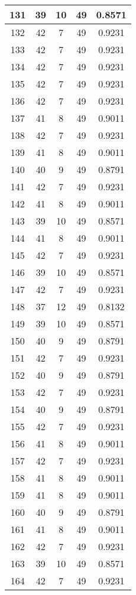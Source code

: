\documentclass[letterpaper, 12pt]{article}
\begin{document}
\begin{longtable}{|c|c|c|c|c|}
\hline
131 & 39 & 10 & 49 & 0.8571 \\
\hline
132 & 42 & 7 & 49 & 0.9231 \\
\hline
133 & 42 & 7 & 49 & 0.9231 \\
\hline
134 & 42 & 7 & 49 & 0.9231 \\
\hline
135 & 42 & 7 & 49 & 0.9231 \\
\hline
136 & 42 & 7 & 49 & 0.9231 \\
\hline
137 & 41 & 8 & 49 & 0.9011 \\
\hline
138 & 42 & 7 & 49 & 0.9231 \\
\hline
139 & 41 & 8 & 49 & 0.9011 \\
\hline
140 & 40 & 9 & 49 & 0.8791 \\
\hline
141 & 42 & 7 & 49 & 0.9231 \\
\hline
142 & 41 & 8 & 49 & 0.9011 \\
\hline
143 & 39 & 10 & 49 & 0.8571 \\
\hline
144 & 41 & 8 & 49 & 0.9011 \\
\hline
145 & 42 & 7 & 49 & 0.9231 \\
\hline
146 & 39 & 10 & 49 & 0.8571 \\
\hline
147 & 42 & 7 & 49 & 0.9231 \\
\hline
148 & 37 & 12 & 49 & 0.8132 \\
\hline
149 & 39 & 10 & 49 & 0.8571 \\
\hline
150 & 40 & 9 & 49 & 0.8791 \\
\hline
151 & 42 & 7 & 49 & 0.9231 \\
\hline
152 & 40 & 9 & 49 & 0.8791 \\
\hline
153 & 42 & 7 & 49 & 0.9231 \\
\hline
154 & 40 & 9 & 49 & 0.8791 \\
\hline
155 & 42 & 7 & 49 & 0.9231 \\
\hline
156 & 41 & 8 & 49 & 0.9011 \\
\hline
157 & 42 & 7 & 49 & 0.9231 \\
\hline
158 & 41 & 8 & 49 & 0.9011 \\
\hline
159 & 41 & 8 & 49 & 0.9011 \\
\hline
160 & 40 & 9 & 49 & 0.8791 \\
\hline
161 & 41 & 8 & 49 & 0.9011 \\
\hline
162 & 42 & 7 & 49 & 0.9231 \\
\hline
163 & 39 & 10 & 49 & 0.8571 \\
\hline
164 & 42 & 7 & 49 & 0.9231 \\

\end{longtable}
\end{document}
